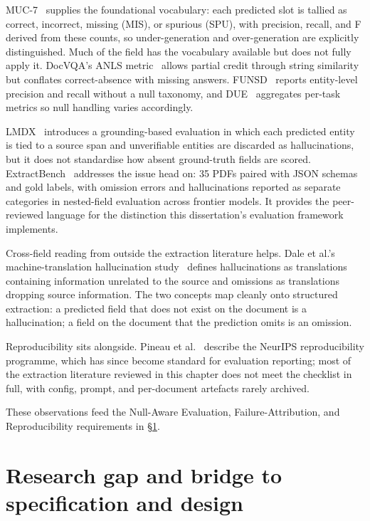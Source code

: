 MUC-7~\cite{chinchor1998muc7} supplies the foundational vocabulary:
each predicted slot is tallied as correct, incorrect, missing (MIS),
or spurious (SPU), with precision, recall, and F derived from these
counts, so under-generation and over-generation are explicitly
distinguished. Much of the field has the vocabulary available but
does not fully apply it. DocVQA's ANLS metric~\cite{mathew2021docvqa}
allows partial credit through string similarity but conflates
correct-absence with missing answers. FUNSD~\cite{jaume2019funsd}
reports entity-level precision and recall without a null taxonomy,
and DUE~\cite{borchmann2021due} aggregates per-task metrics so null
handling varies accordingly.

LMDX~\cite{perot2024lmdx} introduces a grounding-based evaluation in
which each predicted entity is tied to a source span and unverifiable
entities are discarded as hallucinations, but it does not standardise
how absent ground-truth fields are scored.
ExtractBench~\cite{ferguson2026extractbench} addresses the issue head
on: 35 PDFs paired with JSON schemas and gold labels, with omission
errors and hallucinations reported as separate categories in
nested-field evaluation across frontier models. It provides the
peer-reviewed language for the distinction this dissertation's
evaluation framework implements.

Cross-field reading from outside the extraction literature helps.
Dale et al.'s machine-translation hallucination
study~\cite{dale2023hallucination} defines hallucinations as
translations containing information unrelated to the source and
omissions as translations dropping source information. The two
concepts map cleanly onto structured extraction: a predicted field
that does not exist on the document is a hallucination; a field on
the document that the prediction omits is an omission.

Reproducibility sits alongside. Pineau et
al.~\cite{pineau2021reproducibility} describe the NeurIPS
reproducibility programme, which has since become standard for
evaluation reporting; most of the extraction literature reviewed in
this chapter does not meet the checklist in full, with config,
prompt, and per-document artefacts rarely archived.

These observations feed the Null-Aware Evaluation,
Failure-Attribution, and Reproducibility requirements in
\S\ref{sec:lr-gap}.

\section{Research gap and bridge to specification and design}
\label{sec:lr-gap}

